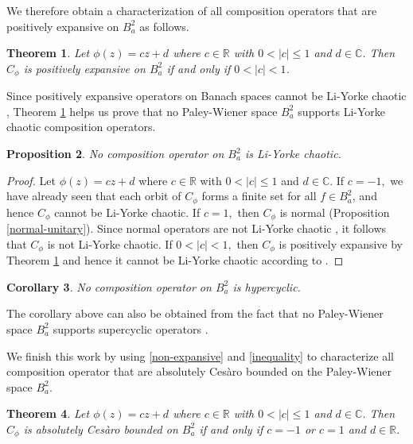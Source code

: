 \documentclass[11pt]{amsart}%
\numberwithin{equation}{section}
\theoremstyle{plain}
\newtheorem{thm}{Theorem}[section]
\newtheorem{cor}[thm]{Corollary}
\newtheorem{prop}[thm]{Proposition}
\theoremstyle{definition}
\theoremstyle{definition}
\begin{document}
We therefore obtain a characterization of all composition operators that are positively expansive on $B^2_a$ as follows.

\begin{thm}\label{ThmExpansive}
Let $\phi(z)=cz+d$ where $c\in \mathbb{R}$ with $0<|c|\leq 1$ and $d\in \mathbb{C}$. Then $C_{\phi}$ is positively expansive on $B^2_a$ if and only if $0<|c|<1$.
\end{thm}


Since positively expansive operators on Banach spaces cannot be Li-Yorke chaotic \cite[Theorem C]{Bernardes}, Theorem \ref{ThmExpansive} helps us prove that no Paley-Wiener space $B^2_a$ supports Li-Yorke chaotic composition operators.



\begin{prop}\label{Li-Yorke chaotic} No composition operator on $B^2_a$ is Li-Yorke chaotic.
\end{prop}
\begin{proof}
Let $\phi(z)=cz+d$ where $c\in \mathbb{R}$ with $0<|c|\leq 1$ and $d\in \mathbb{C}.$ If $c=-1,$ we have already seen that each orbit of $C_{\phi}$ forms a finite set for all $f\in B^2_a$, and hence $C_{\phi}$ cannot be Li-Yorke chaotic. If $c=1,$ then $C_{\phi}$ is normal (Proposition \ref{normal-unitary}). Since normal operators are not Li-Yorke chaotic \cite[Corollary 6]{Bermudez}, it follows that $C_{\phi}$ is not Li-Yorke chaotic. If $0<|c|<1,$ then $C_{\phi}$ is positively expansive by Theorem \ref{ThmExpansive} and hence it cannot be Li-Yorke chaotic according to \cite[Theorem C]{Bernardes}.
\end{proof}

\begin{cor} No composition operator on $B^2_a$ is hypercyclic.
\end{cor}

The corollary above can also be obtained from the fact that no Paley-Wiener space $B^2_a$ supports supercyclic operators \cite[Theorem 4]{Hai}.

We finish this work by using \eqref{non-expansive} and \eqref{inequality} to characterize all composition operator that are absolutely Ces\`aro bounded on the Paley-Wiener space $B^2_a.$


\begin{thm}\label{abs}
Let $\phi(z)=cz+d$ where $c\in \mathbb{R}$ with $0<|c|\leq1$ and $d\in \mathbb{C}$. Then $C_{\phi}$ is absolutely Ces\`aro bounded on $ B^2_a$ if and only if $c=-1$ or $c=1$ and $d\in\mathbb{R}.$ 
\end{thm}
\end{document}
